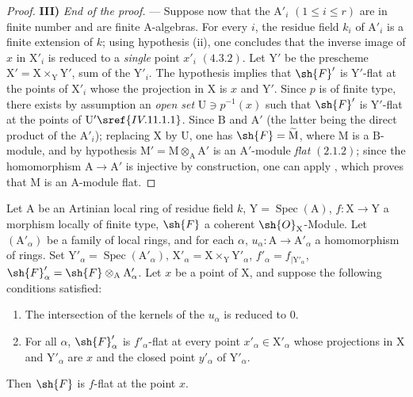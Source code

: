 \begin{proof}
\medskip
\noindent\textbf{III)} \emph{End of the proof.} --- Suppose now that the $\mathrm{A}'_i$ $(1\leq i\leq r)$ are
in finite number and are finite $\mathrm{A}$-algebras. For every $i$, the residue field $k_i$ of $\mathrm{A}'_i$
is a finite extension of $k$; using hypothesis (ii), one concludes that the inverse
image of $x$ in $\mathrm{X}'_i$ is reduced to a \emph{single} point $x'_i$ $(4.3.2)$. Let $\mathrm{Y}'$ be the prescheme
$\mathrm{X}'=\mathrm{X}\times_\mathrm{Y}\mathrm{Y}'$, sum of the $\mathrm{Y}'_i$. The hypothesis implies that $\sh{F}'$
is $\mathrm{Y}'$-flat at the points of $\mathrm{X}'_i$ whose the projection
in $\mathrm{X}$ is $x$ and $\mathrm{Y}'$. Since $p$
is of finite type, there exists by assumption an \emph{open set} $\mathrm{U}\ni p^{-1}(x)$ such that $\sh{F}'$ is $\mathrm{Y}'$-flat at the
points of $\mathrm{U}' \sref{IV.11.1.1}$. Since $\mathrm{B}$ and $\mathrm{A}'$
(the latter being the direct product of the $\mathrm{A}'_i$); replacing $\mathrm{X}$ by $\mathrm{U}$,
one has $\sh{F}=\widetilde{\mathrm{M}}$, where $\mathrm{M}$ is a $\mathrm{B}$-module, and by hypothesis $\mathrm{M}'=\mathrm{M}\otimes_\mathrm{A}\mathrm{A}'$ is an
$\mathrm{A}'$-module \emph{flat} $(2.1.2)$; since the homomorphism $\mathrm{A}\to\mathrm{A}'$ is injective by construction,
one can apply , which proves that $\mathrm{M}$ is an $\mathrm{A}$-module flat.
\end{proof}

\begin{proposition}[11.4.12]
\label{IV.11.4.12}
Let $\mathrm{A}$ be an Artinian local ring of residue field $k$,
$\mathrm{Y}=\operatorname{Spec}(\mathrm{A})$, $f:\mathrm{X}\to\mathrm{Y}$ a morphism locally of finite type, $\sh{F}$ a coherent $\sh{O}_\mathrm{X}$-Module.
Let $(\mathrm{A}'_\alpha)$ be a family of local rings, and for each $\alpha$, $u_\alpha:\mathrm{A}\to\mathrm{A}'_\alpha$ a homomorphism
of rings. Set $\mathrm{Y}'_\alpha=\operatorname{Spec}(\mathrm{A}'_\alpha)$, $\mathrm{X}'_\alpha=\mathrm{X}\times_\mathrm{Y}\mathrm{Y}'_\alpha$, $f'_\alpha=f_{|\mathrm{Y}'_\alpha}$, $\sh{F}'_\alpha=\sh{F}\otimes_\mathrm{A}\mathrm{A}'_\alpha$. Let $x$ be a point
of $\mathrm{X}$, and suppose the following conditions satisfied:
\begin{enumerate}[label=(\roman*)]
  \item The intersection of the kernels of the $u_\alpha$ is reduced to $0$.
  \item For all $\alpha$, $\sh{F}'_\alpha$ is $f'_\alpha$-flat at every point $x'_\alpha\in\mathrm{X}'_\alpha$ whose projections in $\mathrm{X}$ and $\mathrm{Y}'_\alpha$
  are $x$ and the closed point $y'_\alpha$ of $\mathrm{Y}'_\alpha$.
\end{enumerate}

Then $\sh{F}$ is $f$-flat at the point $x$.
\end{proposition}

